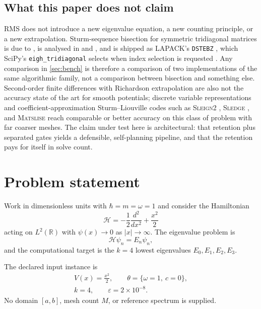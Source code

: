 \documentclass[twocolumn,10pt,a4paper]{article}
\theoremstyle{plain}
\theoremstyle{definition}
\newcommand{\Ham}{\mathcal{H}}
\newcommand{\R}{\mathbb{R}}
\newcommand{\eps}{\varepsilon}
\begin{document}
\subsection{What this paper does not claim}

RMS does not introduce a new eigenvalue equation, a new counting principle, or a
new extrapolation. Sturm-sequence bisection for symmetric tridiagonal matrices
is due to \citet{barth1967}, is analysed in \citet{wilkinson1965} and
\citet{parlett1998}, and is shipped as LAPACK's \texttt{DSTEBZ}
\citep{lapack1999}, which SciPy's \texttt{eigh\_tridiagonal} selects when index
selection is requested \citep{virtanen2020}. Any comparison in
\cref{sec:bench} is therefore a comparison of two implementations of the same
algorithmic family, not a comparison between bisection and something else.
Second-order finite differences with Richardson extrapolation are also not the
accuracy state of the art for smooth potentials; discrete variable
representations \citep{colbert1992} and coefficient-approximation Sturm--Liouville
codes such as \textsc{Sleign2} \citep{bailey2001}, \textsc{Sledge}
\citep{pruess1993}, and \textsc{Matslise} \citep{ledoux2005} reach comparable or
better accuracy on this class of problem with far coarser meshes. The claim
under test here is architectural: that retention plus separated gates yields a
defensible, self-planning pipeline, and that the retention pays for itself in
solve count.

\section{Problem statement}
\label{sec:problem}

Work in dimensionless units with $\hbar = m = \omega = 1$ and consider the
Hamiltonian
\begin{equation}
\Ham = -\frac{1}{2}\frac{d^{2}}{dx^{2}} + \frac{x^{2}}{2}
\label{eq:hamiltonian}
\end{equation}
acting on $L^{2}(\R)$ with $\psi(x)\to 0$ as $|x|\to\infty$. The eigenvalue
problem is
\begin{equation}
\Ham\psi_{n} = E_{n}\psi_{n},
\label{eq:eigenproblem}
\end{equation}
and the computational target is the $k=4$ lowest eigenvalues
$E_{0},E_{1},E_{2},E_{3}$.

The declared input instance is
\begin{equation}
\begin{gathered}
V(x) = \frac{x^{2}}{2},\qquad
\theta = \{\omega = 1,\ c = 0\},\\
k = 4,\qquad
\eps = 2\times 10^{-8}.
\end{gathered}
\label{eq:instance}
\end{equation}
No domain $[a,b]$, mesh count $M$, or reference spectrum is supplied.
\end{document}
